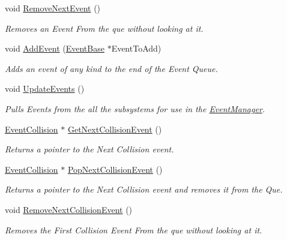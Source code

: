 \begin{DoxyCompactItemize}
void \hyperlink{classphys_1_1EventManager_a2389a44d199f121e1fea741f83248513}{RemoveNextEvent} ()
\begin{DoxyCompactList}\small\item\em Removes an Event From the que without looking at it. \item\end{DoxyCompactList}\item 
void \hyperlink{classphys_1_1EventManager_abada23d83ef38e59a38eb91a88a07404}{AddEvent} (\hyperlink{classphys_1_1EventBase}{EventBase} $\ast$EventToAdd)
\begin{DoxyCompactList}\small\item\em Adds an event of any kind to the end of the Event Queue. \item\end{DoxyCompactList}\item 
void \hyperlink{classphys_1_1EventManager_a63cf23dc9fe0ced3e2c60ca61c97b166}{UpdateEvents} ()
\begin{DoxyCompactList}\small\item\em Pulls Events from the all the subsystems for use in the \hyperlink{classphys_1_1EventManager}{EventManager}. \item\end{DoxyCompactList}\item 
\hyperlink{classphys_1_1EventCollision}{EventCollision} $\ast$ \hyperlink{classphys_1_1EventManager_a8e8f88684cd9167ae59734cf14b64b76}{GetNextCollisionEvent} ()
\begin{DoxyCompactList}\small\item\em Returns a pointer to the Next Collision event. \item\end{DoxyCompactList}\item 
\hyperlink{classphys_1_1EventCollision}{EventCollision} $\ast$ \hyperlink{classphys_1_1EventManager_a6a6ae165032e429c12653565590040cd}{PopNextCollisionEvent} ()
\begin{DoxyCompactList}\small\item\em Returns a pointer to the Next Collision event and removes it from the Que. \item\end{DoxyCompactList}\item 
void \hyperlink{classphys_1_1EventManager_a9556b702c4b84bc8e49f1491104b688f}{RemoveNextCollisionEvent} ()
\begin{DoxyCompactList}\small\item\em Removes the First Collision Event From the que without looking at it. \item\end{DoxyCompactList}\item 

\end{DoxyCompactItemize}
